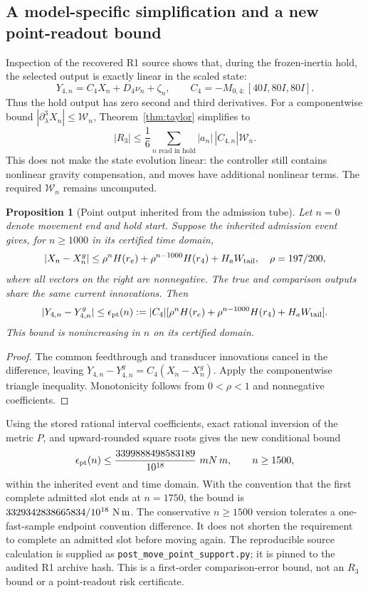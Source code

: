 \documentclass[11pt]{article}
\newtheorem{proposition}[theorem]{Proposition}
\theoremstyle{remark}\newtheorem{remark}[theorem]{Remark}
\begin{document}
\subsection{A model-specific simplification and a new point-readout bound}
Inspection of the recovered R1 source shows that, during the frozen-inertia hold,
the selected output is exactly linear in the scaled state:
\[
 Y_{4,n}=C_4X_n+D_4\nu_n+\zeta_n,\qquad
 C_4=-M_{0,4:}[40I,80I,80I].
\]
Thus the hold output has zero second and third derivatives. For a componentwise bound
$|\partial_\lambda^3X_n|\le\mathcal W_n$, Theorem~\ref{thm:taylor} simplifies to
\[
 |R_3|\le\frac16\sum_{n\text{ read in hold}}|a_n|\,|C_{4,n}|\mathcal W_n.
\]
This does not make the state evolution linear: the controller still contains nonlinear gravity compensation, and moves have additional nonlinear terms. The required $\mathcal W_n$ remains uncomputed.

\begin{proposition}[Point output inherited from the admission tube]\label{prop:point}
Let $n=0$ denote movement end and hold start. Suppose the inherited admission event gives, for $n\ge1000$ in its certified time domain,
\[
 |X_n-X_n^g|\le\rho^n H(r_e)+\rho^{n-1000}H(r_4)+H_aW_{\rm tail},
 \quad \rho=197/200,
\]
where all vectors on the right are nonnegative. The true and comparison outputs share the same current innovations. Then
\[
 |Y_{4,n}-Y^g_{4,n}|\le
 \epsilon_{\rm pt}(n):=|C_4|
 [\rho^nH(r_e)+\rho^{n-1000}H(r_4)+H_aW_{\rm tail}].
\]
This bound is nonincreasing in $n$ on its certified domain.
\end{proposition}
\begin{proof}
The common feedthrough and transducer innovations cancel in the difference, leaving
$Y_{4,n}-Y^g_{4,n}=C_4(X_n-X_n^g)$. Apply the componentwise triangle inequality.
Monotonicity follows from $0<\rho<1$ and nonnegative coefficients.
\end{proof}

Using the stored rational interval coefficients, exact rational inversion of the metric $P$, and upward-rounded square roots gives the new conditional bound
\[
 \epsilon_{\rm pt}(n)\le
 \frac{3399888498583189}{10^{18}}\ {
m N\,m},\qquad n\ge1500,
\]
within the inherited event and time domain. With the convention that the first complete admitted slot ends at $n=1750$, the bound is
$3329342838665834/10^{18}\ {\rm N\,m}$.
The conservative $n\ge1500$ version tolerates a one-fast-sample endpoint convention difference. It does not shorten the requirement to complete an admitted slot before moving again. The reproducible source calculation is supplied as \texttt{post\_move\_point\_support.py}; it is pinned to the audited R1 archive hash. This is a first-order comparison-error bound, not an $R_3$ bound or a point-readout risk certificate.
\end{document}
